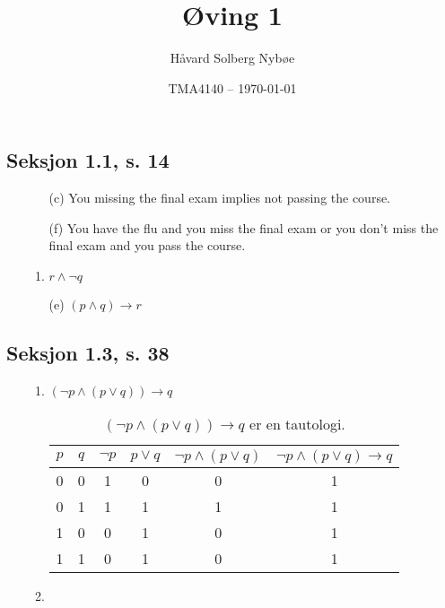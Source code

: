 \documentclass[a4paper, 12pt]{article}  %
\title{Øving 1}               %
\author{Håvard Solberg Nybøe}           %
\date{TMA4140 -- \today}                    %
\begin{document}
\maketitle

\subsection*{Seksjon 1.1, s. 14}
\begin{enumerate} 
    \item [\boxed{14}] 
    \begin{enumerate}
        \item [(c)] You missing the final exam implies not passing the course.
        \item [(f)] You have the flu and you miss the final exam or you don't miss the final exam and you pass the course.
    \end{enumerate}
    \item [\boxed{16}]
    \begin{enumerate}
        \item $r \land \neg q$
        \item [(e)] $(p \land q) \rightarrow r$
    \end{enumerate}
\end{enumerate}

\subsection*{Seksjon 1.3, s. 38}
\begin{enumerate}
    \item [\boxed{12}]
    \begin{enumerate}
        \item $(\neg p \land (p \lor q)) \rightarrow q$
        \begin{table}[h]
            \begin{center}
                \begin{tabular}{|c|c|c|c|c|c|}
                    \hline
                    $p$ & $q$ & $\neg p$ & $p \lor q$ & $\neg p \land (p \lor q)$ & $\neg p \land (p \lor q) \rightarrow q$\\
                    \hline
                    0 & 0 & 1 & 0 & 0 & 1 \\
                    0 & 1 & 1 & 1 & 1 & 1 \\
                    1 & 0 & 0 & 1 & 0 & 1 \\
                    1 & 1 & 0 & 1 & 0 & 1 \\
                    \hline
                \end{tabular}
                \caption*{$(\neg p \land (p \lor q)) \rightarrow q$ er en tautologi.}
            \end{center}
        \end{table}
        \item $ $
    \end{enumerate}
\end{enumerate}
\end{document}
